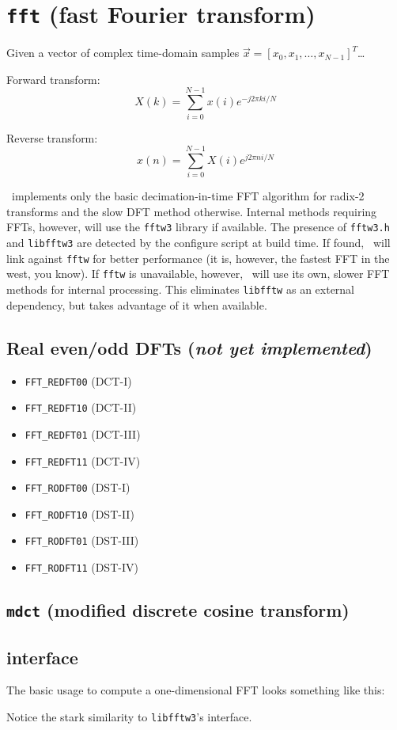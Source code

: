 % 
%

\section{{\tt fft} (fast Fourier transform)}
\label{module:fft}

Given a vector of complex time-domain samples
$\vec{x} = \left[x_0,x_1,\ldots,x_{N-1}\right]^T$\ldots

Forward transform:
\[
    X(k) = \sum_{i=0}^{N-1}{x(i) e^{-j 2 \pi k i/N}}
\]

Reverse transform:
\[
    x(n) = \sum_{i=0}^{N-1}{X(i) e^{ j 2 \pi n i/N}}
\]

\liquid\ implements only the basic decimation-in-time FFT algorithm for
radix-2 transforms and the slow DFT method otherwise.
Internal methods requiring FFTs, however, will use the {\tt fftw3} library
\cite{fftw:web} if available.
The presence of {\tt fftw3.h} and {\tt libfftw3} are detected by the configure
script at build time.
If found, \liquid\ will link against {\tt fftw} for better performance (it is,
however, the fastest FFT in the west, you know).
If {\tt fftw} is unavailable, however, \liquid\ will use its own, slower FFT
methods for internal processing.
This eliminates {\tt libfftw} as an external dependency, but takes advantage
of it when available.

\subsection{Real even/odd DFTs ({\it not yet implemented})}
\label{module:fft:r2r}

\begin{itemize}
\item {\tt FFT\_REDFT00} (DCT-I)
\item {\tt FFT\_REDFT10} (DCT-II)
\item {\tt FFT\_REDFT01} (DCT-III)
\item {\tt FFT\_REDFT11} (DCT-IV)

\item {\tt FFT\_RODFT00} (DST-I)
\item {\tt FFT\_RODFT10} (DST-II)
\item {\tt FFT\_RODFT01} (DST-III)
\item {\tt FFT\_RODFT11} (DST-IV)
\end{itemize}

\subsection{{\tt mdct} (modified discrete cosine transform)}
\label{module:fft:mdct}

\subsection{interface}
The basic usage to compute a one-dimensional FFT looks something like this:
%

%
Notice the stark similarity to {\tt libfftw3}'s interface.

